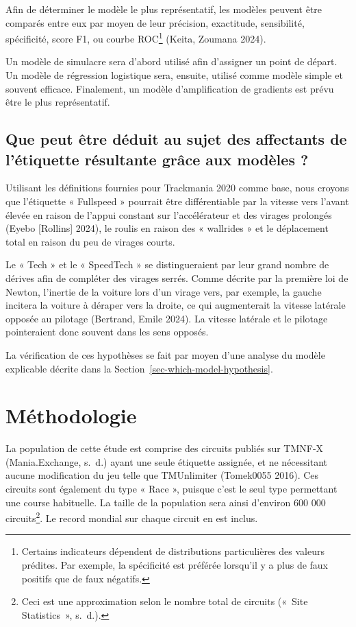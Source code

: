 \documentclass[
  oneside,
  open=any]{scrreprt}
\begin{document}
Afin de déterminer le modèle le plus représentatif, les modèles peuvent
être comparés entre eux par moyen de leur précision, exactitude,
sensibilité, spécificité, score F1, ou courbe ROC\footnote{Certains
  indicateurs dépendent de distributions particulières des valeurs
  prédites. Par exemple, la spécificité est préférée lorsqu'il y a plus
  de faux positifs que de faux négatifs.} (Keita, Zoumana 2024).

Un modèle de simulacre sera d'abord utilisé afin d'assigner un point de
départ. Un modèle de régression logistique sera, ensuite, utilisé comme
modèle simple et souvent efficace. Finalement, un modèle d'amplification
de gradients est prévu être le plus représentatif.

\section{Que peut être déduit au sujet des affectants de l'étiquette
résultante grâce aux modèles
?}\label{que-peut-uxeatre-duxe9duit-au-sujet-des-affectants-de-luxe9tiquette-ruxe9sultante-gruxe2ce-aux-moduxe8les}

Utilisant les définitions fournies pour Trackmania 2020 comme base, nous
croyons que l'étiquette « Fullspeed » pourrait être différentiable par
la vitesse vers l'avant élevée en raison de l'appui constant sur
l'accélérateur et des virages prolongés (Eyebo {[}Rollins{]} 2024), le
roulis en raison des « wallrides » et le déplacement total en raison du
peu de virages courts.

Le « Tech » et le « SpeedTech » se distingueraient par leur grand nombre
de dérives afin de compléter des virages serrés. Comme décrite par la
première loi de Newton, l'inertie de la voiture lors d'un virage vers,
par exemple, la gauche incitera la voiture à déraper vers la droite, ce
qui augmenterait la vitesse latérale opposée au pilotage (Bertrand,
Emile 2024). La vitesse latérale et le pilotage pointeraient donc
souvent dans les sens opposés.

La vérification de ces hypothèses se fait par moyen d'une analyse du
modèle explicable décrite dans la
Section~\ref{sec-which-model-hypothesis}.

\chapter{Méthodologie}\label{sec-method}

La population de cette étude est comprise des circuits publiés sur
TMNF-X (Mania.Exchange, s.~d.) ayant une seule étiquette assignée, et ne
nécessitant aucune modification du jeu telle que TMUnlimiter (Tomek0055
2016). Ces circuits sont également du type « Race », puisque c'est le
seul type permettant une course habituelle. La taille de la population
sera ainsi d'environ 600 000 circuits\footnote{Ceci est une
  approximation selon le nombre total de circuits ({«~Site
  Statistics~»}, s.~d.).}. Le record mondial sur chaque circuit en est
inclus.
\end{document}
